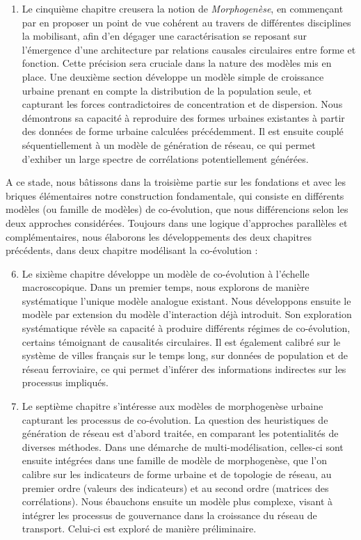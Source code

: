 {\begin{enumerate}
	\item Le cinquième chapitre creusera la notion de \emph{Morphogenèse}, en commençant par en proposer un point de vue cohérent au travers de différentes disciplines la mobilisant, afin d'en dégager une caractérisation se reposant sur l'émergence d'une architecture par relations causales circulaires entre forme et fonction. Cette précision sera cruciale dans la nature des modèles mis en place. Une deuxième section développe un modèle simple de croissance urbaine prenant en compte la distribution de la population seule, et capturant les forces contradictoires de concentration et de dispersion. Nous démontrons sa capacité à reproduire des formes urbaines existantes à partir des données de forme urbaine calculées précédemment. Il est ensuite couplé séquentiellement à un modèle de génération de réseau, ce qui permet d'exhiber un large spectre de corrélations potentiellement générées.
\end{enumerate}
A ce stade, nous bâtissons dans la troisième partie sur les fondations et avec les briques élémentaires notre construction fondamentale, qui consiste en différents modèles (ou famille de modèles) de co-évolution, que nous différencions selon les deux approches considérées. Toujours dans une logique d'approches parallèles et complémentaires, nous élaborons les développements des deux chapitres précédents, dans deux chapitre modélisant la co-évolution :
\begin{enumerate}\setcounter{enumi}{5}
	\item Le sixième chapitre développe un modèle de co-évolution à l'échelle macroscopique. Dans un premier temps, nous explorons de manière systématique l'unique modèle analogue existant. Nous développons ensuite le modèle par extension du modèle d'interaction déjà introduit. Son exploration systématique révèle sa capacité à produire différents régimes de co-évolution, certains témoignant de causalités circulaires. Il est également calibré sur le système de villes français sur le temps long, sur données de population et de réseau ferroviaire, ce qui permet d'inférer des informations indirectes sur les processus impliqués.
	\item Le septième chapitre s'intéresse aux modèles de morphogenèse urbaine capturant les processus de co-évolution. La question des heuristiques de génération de réseau est d'abord traitée, en comparant les potentialités de diverses méthodes. Dans une démarche de multi-modélisation, celles-ci sont ensuite intégrées dans une famille de modèle de morphogenèse, que l'on calibre sur les indicateurs de forme urbaine et de topologie de réseau, au premier ordre (valeurs des indicateurs) et au second ordre (matrices des corrélations). Nous ébauchons ensuite un modèle plus complexe, visant à intégrer les processus de gouvernance dans la croissance du réseau de transport. Celui-ci est exploré de manière préliminaire.

\end{enumerate}}

